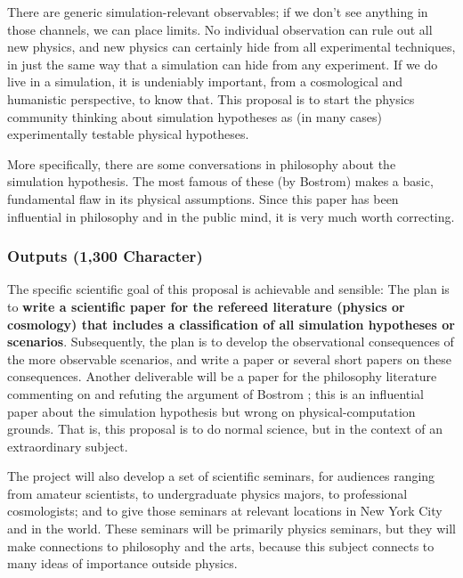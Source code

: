 \documentclass[12pt]{article}
\begin{document}
There are generic simulation-relevant observables; if we don't see anything in those channels, we can place limits.
No individual observation can rule out all new physics, and new physics can certainly hide from all experimental techniques, in just the same way that a simulation can hide from any experiment.
If we do live in a simulation, it is undeniably important, from a cosmological and humanistic perspective, to know that.
This proposal is to start the physics community thinking about simulation hypotheses as (in many cases) experimentally testable physical hypotheses.

More specifically, there are some conversations in philosophy about the simulation hypothesis.
The most famous of these (by Bostrom) makes a basic, fundamental flaw in its physical assumptions.
Since this paper has been influential in philosophy and in the public mind, it is very much worth correcting.

\subsubsection*{Outputs (1,300 Character)}
The specific scientific goal of this proposal is achievable and sensible:
The plan is to \textbf{write a scientific paper for the refereed literature (physics or cosmology) that includes a classification of all simulation hypotheses or scenarios}.
Subsequently, the plan is to develop the observational consequences of the more observable scenarios, and write a paper or several short papers on these consequences.
Another deliverable will be a paper for the philosophy literature commenting on and refuting the argument of Bostrom \cite{bostrom}; this is an influential paper about the simulation hypothesis but wrong on physical-computation grounds.
That is, this proposal is to do normal science, but in the context of an extraordinary subject.

The project will also develop a set of scientific seminars, for audiences ranging from amateur scientists, to undergraduate physics majors, to professional cosmologists; and to give those seminars at relevant locations in New York City and in the world.
These seminars will be primarily physics seminars, but they will make connections to philosophy and the arts, because this subject connects to many ideas of importance outside physics.
\end{document}
